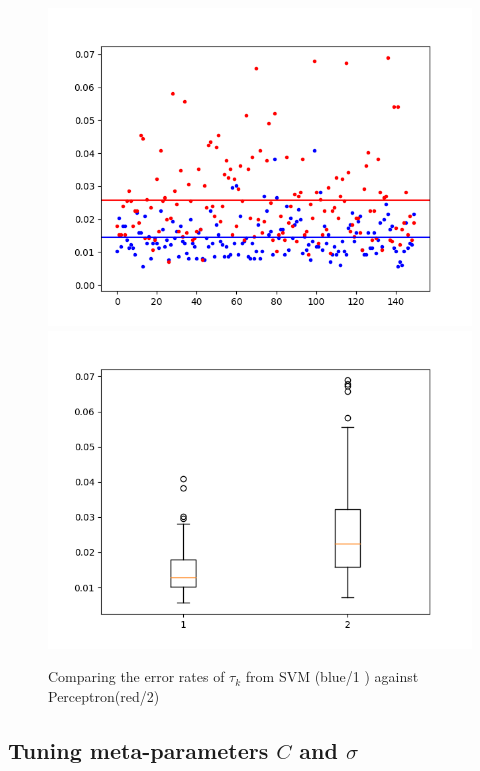 \begin{figure}[!h]
\begin{center}
\centering
\includegraphics[width=1\textwidth]{figures/new/perc_vs_svm}
\includegraphics[width=1\textwidth]{figures/new/perc_vs_svm_boxplot}
\end{center}
\caption{\label{fig:error_SVM_perc} Comparing the error rates of $\tau_k$ from SVM (blue/1 ) against Perceptron(red/2) }
\end{figure}



\subsection{Tuning meta-parameters $C$ and $\sigma$}

